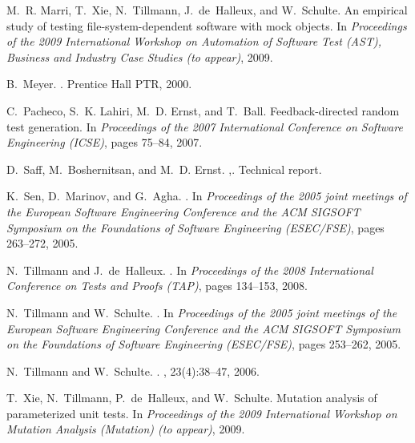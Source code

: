 \documentclass{sig-alternate}
\begin{document}
\begin{thebibliography}{10}
\vfill\eject
{}
M.~R. Marri, T.~Xie, N.~Tillmann, J.~de~Halleux, and W.~Schulte.
\newblock An empirical study of testing file-system-dependent software with
  mock objects.
\newblock In {\em Proceedings of the 2009 International Workshop on Automation
  of Software Test (AST), Business and Industry Case Studies (to appear)},
  2009.

B.~Meyer.
.
\newblock Prentice Hall PTR, 2000.

C.~Pacheco, S.~K. Lahiri, M.~D. Ernst, and T.~Ball.
\newblock Feedback-directed random test generation.
\newblock In {\em Proceedings of the 2007 International Conference on Software
  Engineering (ICSE)}, pages 75--84, 2007.

D.~Saff, M.~Boshernitsan, and M.~D. Ernst.
,.
\newblock Technical report.

K.~Sen, D.~Marinov, and G.~Agha.
.
\newblock In {\em Proceedings of the 2005 joint meetings of the European
  Software Engineering Conference and the ACM SIGSOFT Symposium on the
  Foundations of Software Engineering (ESEC/FSE)}, pages 263--272, 2005.

N.~Tillmann and J.~de~Halleux.
.
\newblock In {\em Proceedings of the 2008 International Conference on Tests and
  Proofs (TAP)}, pages 134--153, 2008.

N.~Tillmann and W.~Schulte.
.
\newblock In {\em Proceedings of the 2005 joint meetings of the European
  Software Engineering Conference and the ACM SIGSOFT Symposium on the
  Foundations of Software Engineering (ESEC/FSE)}, pages 253--262, 2005.

N.~Tillmann and W.~Schulte.
.
, 23(4):38--47, 2006.

T.~Xie, N.~Tillmann, P.~de~Halleux, and W.~Schulte.
\newblock Mutation analysis of parameterized unit tests.
\newblock In {\em Proceedings of the 2009 International Workshop on Mutation
  Analysis (Mutation) (to appear)}, 2009.

\end{thebibliography}
%
\end{document}

